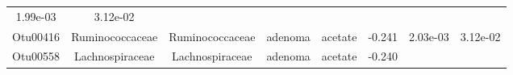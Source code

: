 \documentclass[11pt,]{article}
\begin{document}
\begin{longtable}[]{@{}cccccccc@{}}
\begin{minipage}[t]{0.08\columnwidth}
1.99e-03\strut
\end{minipage} & \begin{minipage}[t]{0.08\columnwidth}\centering\strut
3.12e-02\strut
\end{minipage}\tabularnewline
\begin{minipage}[t]{0.08\columnwidth}\centering\strut
Otu00416\strut
\end{minipage} & \begin{minipage}[t]{0.15\columnwidth}\centering\strut
Ruminococcaceae\strut
\end{minipage} & \begin{minipage}[t]{0.15\columnwidth}\centering\strut
Ruminococcaceae\strut
\end{minipage} & \begin{minipage}[t]{0.08\columnwidth}\centering\strut
adenoma\strut
\end{minipage} & \begin{minipage}[t]{0.09\columnwidth}\centering\strut
acetate\strut
\end{minipage} & \begin{minipage}[t]{0.07\columnwidth}\centering\strut
-0.241\strut
\end{minipage} & \begin{minipage}[t]{0.08\columnwidth}\centering\strut
2.03e-03\strut
\end{minipage} & \begin{minipage}[t]{0.08\columnwidth}\centering\strut
3.12e-02\strut
\end{minipage}\tabularnewline
\begin{minipage}[t]{0.08\columnwidth}\centering\strut
Otu00558\strut
\end{minipage} & \begin{minipage}[t]{0.15\columnwidth}\centering\strut
Lachnospiraceae\strut
\end{minipage} & \begin{minipage}[t]{0.15\columnwidth}\centering\strut
Lachnospiraceae\strut
\end{minipage} & \begin{minipage}[t]{0.08\columnwidth}\centering\strut
adenoma\strut
\end{minipage} & \begin{minipage}[t]{0.09\columnwidth}\centering\strut
acetate\strut
\end{minipage} & \begin{minipage}[t]{0.07\columnwidth}\centering\strut
-0.240\strut
\end{minipage} & \begin{minipage}[t]{0.08\columnwidth}\centering\strut

\end{minipage}
\end{longtable}
\end{document}

